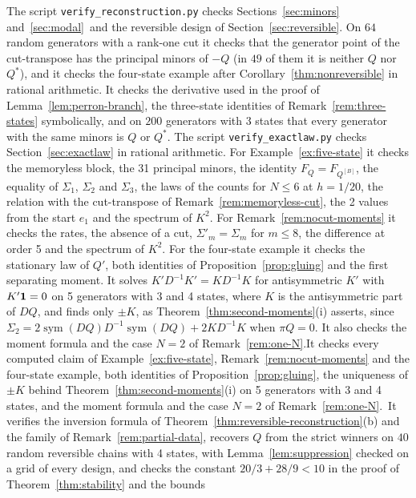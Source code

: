 The script \texttt{verify\_reconstruction.py} checks Sections~\ref{sec:minors}
and~\ref{sec:modal}\ifarxivbuild\ and the reversible design of Section~\ref{sec:reversible}\fi.
On $64$ random generators with a rank-one cut it checks that the generator point of the
cut-transpose has the principal minors of $-Q$ (in $49$ of them it is neither $Q$ nor $Q^*$), and
it checks the four-state example after Corollary~\ref{thm:nonreversible} in rational arithmetic.
It checks the derivative used in the proof of Lemma~\ref{lem:perron-branch}, the three-state
identities of Remark~\ref{rem:three-states} symbolically, and on $200$ generators with 3 states
that every generator with the same minors is $Q$ or $Q^*$. The script
\texttt{verify\_exactlaw.py} checks Section~\ref{sec:exactlaw} in rational arithmetic. \ifarxivbuild For
Example~\ref{ex:five-state} it checks the memoryless block, the 31 principal minors, the identity
$F_Q=F_{Q^{[B]}}$, the equality of $\Sigma_1$, $\Sigma_2$ and $\Sigma_3$, the laws of the counts for
$N\le6$ at $h=1/20$, the relation with the cut-transpose of Remark~\ref{rem:memoryless-cut}, the
2 values from the start $e_1$ and the spectrum of $K^2$. For Remark~\ref{rem:nocut-moments} it
checks the rates, the absence of a cut, $\Sigma'_m=\Sigma_m$ for $m\le8$, the difference at
order 5 and the spectrum of $K^2$. For the four-state example it checks the stationary law of
$Q'$, both identities of Proposition~\ref{prop:gluing} and the first separating moment. It solves
$K'D^{-1}K'=KD^{-1}K$ for antisymmetric $K'$ with $K'\mathbf{1}=0$ on 5 generators with 3 and 4 states,
where $K$ is the antisymmetric part of $DQ$, and finds only $\pm K$, as
Theorem~\ref{thm:second-moments}(i) asserts, since $\Sigma_2=2\operatorname{sym}(DQ)D^{-1}\operatorname{sym}(DQ)+2KD^{-1}K$
when $\pi Q=0$. It also checks the moment formula and the case $N=2$ of
Remark~\ref{rem:one-N}.\else It checks
every computed claim of Example~\ref{ex:five-state}, Remark~\ref{rem:nocut-moments} and the
four-state example, both identities of Proposition~\ref{prop:gluing}, the uniqueness of $\pm K$
behind Theorem~\ref{thm:second-moments}(i) on 5 generators with 3 and 4 states, and the moment
formula and the case $N=2$ of Remark~\ref{rem:one-N}.\fi\ifarxivbuild\ It verifies the inversion
formula of Theorem~\ref{thm:reversible-reconstruction}(b) and the family of
Remark~\ref{rem:partial-data}, recovers $Q$ from the strict winners on $40$ random reversible
chains with 4 states, with Lemma~\ref{lem:suppression} checked on a grid of every design, and
checks the constant $20/3+28/9<10$ in the proof of Theorem~\ref{thm:stability} and the bounds
